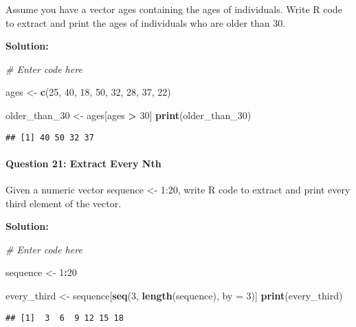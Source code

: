 \documentclass[
]{article}
\newenvironment{Shaded}{\begin{snugshade}}{\end{snugshade}}
\newcommand{\AttributeTok}[1]{\textcolor[rgb]{0.13,0.29,0.53}{#1}}
\newcommand{\CommentTok}[1]{\textcolor[rgb]{0.56,0.35,0.01}{\textit{#1}}}
\newcommand{\DecValTok}[1]{\textcolor[rgb]{0.00,0.00,0.81}{#1}}
\newcommand{\FunctionTok}[1]{\textcolor[rgb]{0.13,0.29,0.53}{\textbf{#1}}}
\newcommand{\NormalTok}[1]{#1}
\newcommand{\OtherTok}[1]{\textcolor[rgb]{0.56,0.35,0.01}{#1}}
\newcommand{\SpecialCharTok}[1]{\textcolor[rgb]{0.81,0.36,0.00}{\textbf{#1}}}
\begin{document}
Assume you have a vector ages containing the ages of individuals. Write
R code to extract and print the ages of individuals who are older than
30.

\textbf{Solution:}

\begin{Shaded}
\begin{Highlighting}[]
\CommentTok{\# Enter code here}

\NormalTok{ages }\OtherTok{\textless{}{-}} \FunctionTok{c}\NormalTok{(}\DecValTok{25}\NormalTok{, }\DecValTok{40}\NormalTok{, }\DecValTok{18}\NormalTok{, }\DecValTok{50}\NormalTok{, }\DecValTok{32}\NormalTok{, }\DecValTok{28}\NormalTok{, }\DecValTok{37}\NormalTok{, }\DecValTok{22}\NormalTok{)}

\NormalTok{older\_than\_30 }\OtherTok{\textless{}{-}}\NormalTok{ ages[ages }\SpecialCharTok{\textgreater{}} \DecValTok{30}\NormalTok{]}
\FunctionTok{print}\NormalTok{(older\_than\_30)}
\end{Highlighting}
\end{Shaded}

\begin{verbatim}
## [1] 40 50 32 37
\end{verbatim}

\hypertarget{question-21-extract-every-nth}{%
\paragraph{Question 21: Extract Every
Nth}\label{question-21-extract-every-nth}}

Given a numeric vector sequence \textless- 1:20, write R code to extract
and print every third element of the vector.

\textbf{Solution:}

\begin{Shaded}
\begin{Highlighting}[]
\CommentTok{\# Enter code here}

\NormalTok{sequence }\OtherTok{\textless{}{-}} \DecValTok{1}\SpecialCharTok{:}\DecValTok{20}

\NormalTok{every\_third }\OtherTok{\textless{}{-}}\NormalTok{ sequence[}\FunctionTok{seq}\NormalTok{(}\DecValTok{3}\NormalTok{, }\FunctionTok{length}\NormalTok{(sequence), }\AttributeTok{by =} \DecValTok{3}\NormalTok{)]}
\FunctionTok{print}\NormalTok{(every\_third)}
\end{Highlighting}
\end{Shaded}

\begin{verbatim}
## [1]  3  6  9 12 15 18
\end{verbatim}
\end{document}
